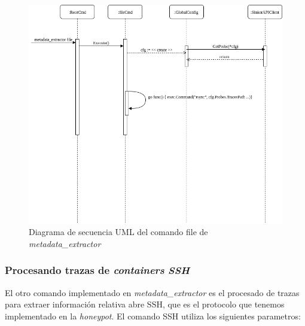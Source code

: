 \begin{figure}[htp]
    \centering
      \includegraphics[scale=0.4]{images/UMLSequenceFileOp}
    \caption{Diagrama de secuencia UML del comando file de \emph{metadata\_extractor}}
    \label{fig:uml-sequence-file-metadata-extractor}
\end{figure}

\subsubsection{Procesando trazas de \emph{containers} \emph{SSH}}

El otro comando implementado en \emph{metadata\_extractor} es el procesado de trazas para extraer información relativa abre
SSH, que es el protocolo que tenemos implementado en la \emph{honeypot}. El comando SSH utiliza los siguientes parametros:

